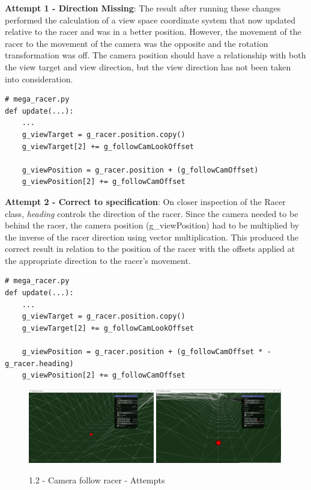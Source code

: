 \documentclass[a4 paper, 12pt]{article}
\begin{document}
\textbf{Attempt 1 - Direction Missing}: The result after running these changes performed the calculation of a view space coordinate system that now updated relative to the racer and was in a better position. However, the movement of the racer to the movement of the camera was the opposite and the rotation transformation was off. The camera position should have a relationship with both the view target and view direction, but the view direction has not been taken into consideration. 
    \begin{lstlisting}
# mega_racer.py
def update(...):
    ...
    g_viewTarget = g_racer.position.copy()
    g_viewTarget[2] += g_followCamLookOffset

    g_viewPosition = g_racer.position + (g_followCamOffset)
    g_viewPosition[2] += g_followCamOffset
    \end{lstlisting}

\textbf{Attempt 2 - Correct to specification}:
On closer inspection of the Racer class, \textit{heading} controls the direction of the racer. Since the camera needed to be behind the racer, the camera position (g\_viewPosition) had to be multiplied by the inverse of the racer direction using vector multiplication. This produced the correct result in relation to the position of the racer with the offsets applied at the appropriate direction to the racer's movement.

\begin{lstlisting}
# mega_racer.py
def update(...):
    ...
    g_viewTarget = g_racer.position.copy()
    g_viewTarget[2] += g_followCamLookOffset

    g_viewPosition = g_racer.position + (g_followCamOffset * -g_racer.heading)
    g_viewPosition[2] += g_followCamOffset
\end{lstlisting}

\begin{figure} [H]
    \includegraphics[width=0.49\textwidth, frame]
        {./images/mega_racer/1.2_1.PNG}
        \includegraphics[width=0.49\textwidth, frame]
        {./images/mega_racer/1.2_2.PNG}
    \caption{1.2 - Camera follow racer - Attempts}
\end{figure}
\end{document}
